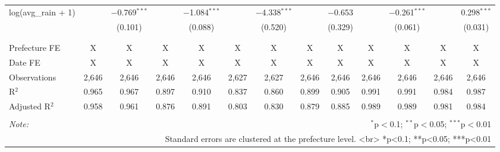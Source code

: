 \begin{sidewaystable}[!htbp]
\begin{tabular}{@{\extracolsep{-25pt}}lcccccccccccc}
 log(avg\_rain + 1) &  & $-$0.769$^{***}$ &  & $-$1.084$^{***}$ &  & $-$4.338$^{***}$ &  & $-$0.653 &  & $-$0.261$^{***}$ &  & 0.298$^{***}$ \\ 
  &  & (0.101) &  & (0.088) &  & (0.520) &  & (0.329) &  & (0.061) &  & (0.031) \\ 
  & & & & & & & & & & & & \\ 
\hline \\[-1.8ex] 
Prefecture FE & X & X & X & X & X & X & X & X & X & X & X & X \\ 
Date FE & X & X & X & X & X & X & X & X & X & X & X & X \\ 
Observations & 2,646 & 2,646 & 2,646 & 2,646 & 2,627 & 2,627 & 2,646 & 2,646 & 2,646 & 2,646 & 2,646 & 2,646 \\ 
R$^{2}$ & 0.965 & 0.967 & 0.897 & 0.910 & 0.837 & 0.860 & 0.899 & 0.905 & 0.991 & 0.991 & 0.984 & 0.987 \\ 
Adjusted R$^{2}$ & 0.958 & 0.961 & 0.876 & 0.891 & 0.803 & 0.830 & 0.879 & 0.885 & 0.989 & 0.989 & 0.981 & 0.984 \\ 
\hline 
\hline \\[-1.8ex] 
\textit{Note:}  & \multicolumn{12}{r}{$^{*}$p$<$0.1; $^{**}$p$<$0.05; $^{***}$p$<$0.01} \\ 
 & \multicolumn{12}{r}{Standard errors are clustered at the prefecture level. <br> *p<0.1; **p<0.05; ***p<0.01} \\ 
\end{tabular} 
\end{sidewaystable} 
